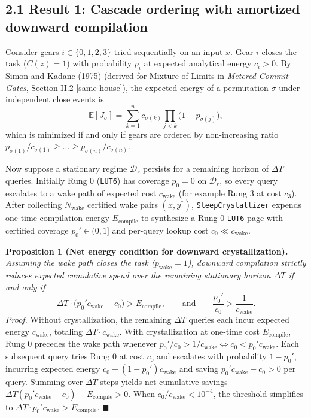 \documentclass[10pt]{article}
\begin{document}
\subsection{2.1 Result 1: Cascade ordering with amortized downward compilation}\label{result-1}

Consider gears $i \in \{0, 1, 2, 3\}$ tried sequentially on an input $x$. Gear $i$ closes the task ($C(z)=1$) with probability $p_i$ at expected analytical energy $c_i > 0$. By Simon and Kadane (1975) (derived for Mixture of Limits in \emph{Metered Commit Gates}, Section II.2 [same house]), the expected energy of a permutation $\sigma$ under independent close events is
\[
  \mathbb{E}[J_\sigma] = \sum_{k=1}^{n} c_{\sigma(k)} \prod_{j < k} \bigl(1 - p_{\sigma(j)}\bigr),
\]
which is minimized if and only if gears are ordered by non-increasing ratio $p_{\sigma(1)}/c_{\sigma(1)} \ge \dots \ge p_{\sigma(n)}/c_{\sigma(n)}$.

Now suppose a stationary regime $\mathcal{D}_r$ persists for a remaining horizon of $\Delta T$ queries. Initially Rung 0 (\texttt{LUT6}) has coverage $p_0 = 0$ on $\mathcal{D}_r$, so every query escalates to a wake path of expected cost $c_{\text{wake}}$ (for example Rung 3 at cost $c_3$). After collecting $N_{\text{wake}}$ certified wake pairs $(x, y^*)$, \texttt{SleepCrystallizer} expends one-time compilation energy $E_{\text{compile}}$ to synthesize a Rung 0 \texttt{LUT6} page with certified coverage $p_0' \in (0, 1]$ and per-query lookup cost $c_0 \ll c_{\text{wake}}$.

\textbf{Proposition 1 (Net energy condition for downward crystallization).} \emph{Assuming the wake path closes the task ($p_{\text{wake}} = 1$), downward compilation strictly reduces expected cumulative spend over the remaining stationary horizon $\Delta T$ if and only if}
\[
  \Delta T \cdot \bigl(p_0' c_{\text{wake}} - c_0\bigr) > E_{\text{compile}}, \qquad \text{and} \qquad \frac{p_0'}{c_0} > \frac{1}{c_{\text{wake}}}.
\]
\emph{Proof.} Without crystallization, the remaining $\Delta T$ queries each incur expected energy $c_{\text{wake}}$, totaling $\Delta T \cdot c_{\text{wake}}$. With crystallization at one-time cost $E_{\text{compile}}$, Rung 0 precedes the wake path whenever $p_0'/c_0 > 1/c_{\text{wake}} \iff c_0 < p_0' c_{\text{wake}}$. Each subsequent query tries Rung 0 at cost $c_0$ and escalates with probability $1 - p_0'$, incurring expected energy $c_0 + (1 - p_0') c_{\text{wake}}$ and saving $p_0' c_{\text{wake}} - c_0 > 0$ per query. Summing over $\Delta T$ steps yields net cumulative savings $\Delta T(p_0' c_{\text{wake}} - c_0) - E_{\text{compile}} > 0$. When $c_0 / c_{\text{wake}} < 10^{-4}$, the threshold simplifies to $\Delta T \cdot p_0' c_{\text{wake}} > E_{\text{compile}}$. $\blacksquare$
\end{document}
